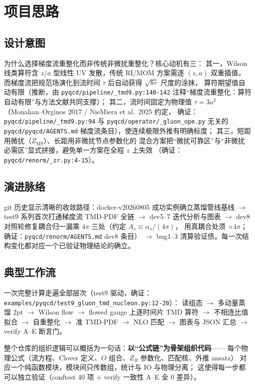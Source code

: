 \documentclass[UTF8]{ctexart}
\begin{document}
\section{项目思路}

\subsection{设计意图}
为什么选择梯度流重整化而非传统非微扰重整化？核心动机有三：
其一，Wilson 线类算符含 $z/a$ 型线性 UV 发散，传统 RI/MOM 方案需逐 $(z,a)$ 双重插值，
而梯度流把规范场演化到流时间 $\tau$ 后自动获得 $\sqrt{8\tau}$ 尺度的涂抹，
算符期望值自动有限（推断，由 \texttt{\nolinkurl{pyqcd/pipeline/_tmd9.py:140-142}}
注释``梯度流重整化：算符自动有限''与方法文献共同支撑）；
其二，流时间固定为物理值 $\tau=3a^2$（Monahan--Orginos 2017 / NieMiera et al.\ 2025 约定，
确证：\texttt{\nolinkurl{pyqcd/pipeline/_tmd9.py:94}} 与
\texttt{\nolinkurl{pyqcd/operator/_gluon_ope.py}} 无关的
\texttt{\nolinkurl{pyqcd/pyqcd/AGENTS.md}} 梯度流条目），使连续极限外推有明确标度；
其三，短距用微扰（$Z_{\overline{\mathrm{MS}}}$）、长距用非微扰节点参数化的
混合方案把``微扰可靠区''与``非微扰必需区''显式拼接，避免单一方案在全程 $z$ 上失效
（确证：\texttt{\nolinkurl{pyqcd/renorm/_zr.py:4-15}}）。

\subsection{演进脉络}
git 历史显示清晰的收敛路径：docker-v20260805 成功实例确立蒸馏管线基线 $\to$
test9 系列首次打通梯度流 TMD-PDF 全链 $\to$ dev5--7 迭代分析与图表
$\to$ dev8 对照轮修复耦合归一漏乘 $4\pi$ 三处（约定 $A_s\equiv\alpha_s/(4\pi)$，
用真耦合处须 $\times 4\pi$；确证：\texttt{\nolinkurl{pyqcd/renorm/AGENTS.md}} dev8 条目）
$\to$ bug1--3 清算验证债。每一次结构变化都对应一个已验证物理结论的确立。

\subsection{典型工作流}
一次完整计算走遍全部层次（test9 驱动，确证：
\texttt{\nolinkurl{examples/pyqcd/test9_gluon_tmd_nucleon.py:12-20}}）：
读组态 $\to$ 多动量蒸馏 2pt $\to$ Wilson flow $\to$ flowed gauge 上逐时间片 TMD 算符
$\to$ 不相连比值拟合 $\to$ 自重整化 $\to$ 准 TMD-PDF $\to$ NLO 匹配 $\to$
图表与 JSON 汇总 $\to$ verify A--E 断言门。

\begin{ideabox}
整个仓库的组织逻辑可以概括为一句话：\textbf{以``公式链''为骨架组织代码}——
每个物理公式（流方程、Clover 定义、$O$ 组合、$Z_R$ 参数化、匹配核、外推 ansatz）
对应一个纯函数模块，模块间只传数组，统计与 IO 与物理分离；
这使得每一步都可以独立验证（conftest 40 项 + verify 一致性 A--E 全 0 差异）。
\end{ideabox}
\end{document}

